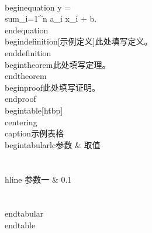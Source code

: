 \\begin{equation} y = \\sum_{i=1}^{n} a_i x_i + b. \\end{equation}
\\begin{definition}[示例定义]此处填写定义。\\end{definition}
\\begin{theorem}此处填写定理。\\end{theorem}
\\begin{proof}此处填写证明。\\end{proof}
\\begin{table}[htbp]\\centering\\caption{示例表格}\\begin{tabular}{lc}参数 & 取值 \\\\ \\hline 参数一 & 0.1 \\\\ \\end{tabular}\\end{table}
